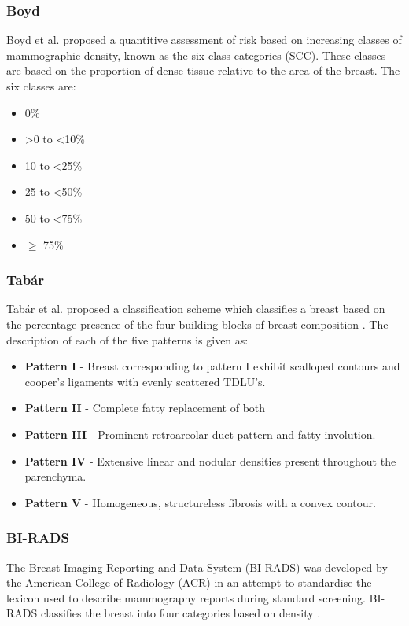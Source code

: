 \subsubsection{Boyd}
Boyd et al. \cite{boyd1995quantitative} proposed a quantitive assessment of risk based on increasing classes of mammographic density, known as the six class categories (SCC). These classes are based on the proportion of dense tissue relative to the area of the breast. The six classes are:

\begin{itemize}
	\item 0\%
	\item \textgreater 0 to \textless 10\% 
	\item 10 to \textless 25\% 
	\item 25 to \textless 50\%
	\item 50 to \textless 75\%
	\item $\geq$ 75\%
\end{itemize}

\subsubsection{Tab\'{a}r}
Tab\'{a}r et al. \cite{gram1997tabar} proposed a classification scheme which classifies a breast based on the percentage presence of the four building blocks of breast composition \cite{gram1997tabar, tabar2005breast}. The description of each of the five patterns is given as:

\begin{itemize}
	\item \textbf{Pattern I} - Breast corresponding to pattern I exhibit scalloped contours and cooper's ligaments with evenly scattered TDLU's.
	\item \textbf{Pattern II} - Complete fatty replacement of both
	\item \textbf{Pattern III} - Prominent retroareolar duct pattern and fatty involution.
	\item \textbf{Pattern IV} - Extensive linear and nodular densities present throughout the parenchyma.
	\item \textbf{Pattern V} - Homogeneous, structureless fibrosis with a convex contour.
\end{itemize}

\subsubsection{BI-RADS}
The Breast Imaging Reporting and Data System (BI-RADS) \cite{balleyguier2007birads} was developed by the American College of Radiology (ACR) in an attempt to standardise the lexicon used to describe mammography reports during standard screening. BI-RADS classifies the breast into four categories based on density \cite{balleyguier2007birads}.

